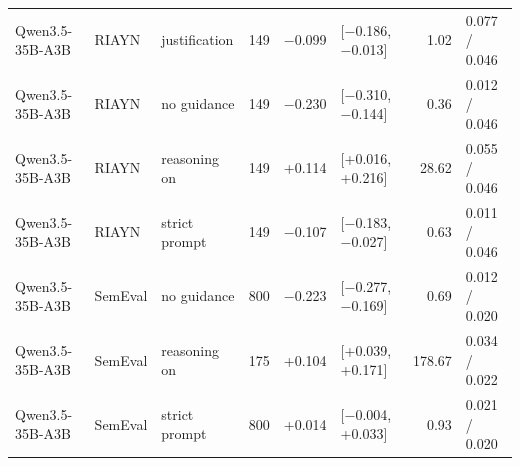 \documentclass[10pt]{article}
\begin{document}
\begin{longtable}{ll>{\raggedright\arraybackslash}p{3.1cm}rrlrl}
Qwen3.5-35B-A3B & RIAYN & justification & 149 & $-$0.099 & [$-$0.186, $-$0.013] & 1.02 & 0.077 / 0.046 \\
Qwen3.5-35B-A3B & RIAYN & no guidance & 149 & $-$0.230 & [$-$0.310, $-$0.144] & 0.36 & 0.012 / 0.046 \\
Qwen3.5-35B-A3B & RIAYN & reasoning on & 149 & +0.114 & [+0.016, +0.216] & 28.62 & 0.055 / 0.046 \\
Qwen3.5-35B-A3B & RIAYN & strict prompt & 149 & $-$0.107 & [$-$0.183, $-$0.027] & 0.63 & 0.011 / 0.046 \\
Qwen3.5-35B-A3B & SemEval & no guidance & 800 & $-$0.223 & [$-$0.277, $-$0.169] & 0.69 & 0.012 / 0.020 \\
Qwen3.5-35B-A3B & SemEval & reasoning on & 175 & +0.104 & [+0.039, +0.171] & 178.67 & 0.034 / 0.022 \\
Qwen3.5-35B-A3B & SemEval & strict prompt & 800 & +0.014 & [$-$0.004, +0.033] & 0.93 & 0.021 / 0.020 \\
\hline
\end{longtable}
\endgroup
\end{document}
